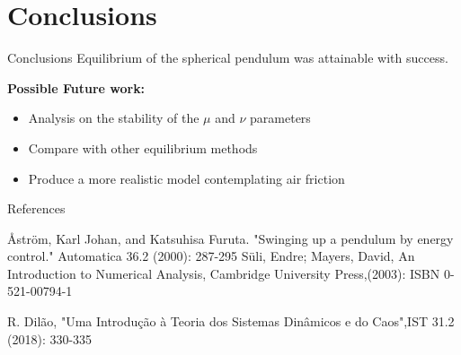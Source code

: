 \documentclass{beamer}
\begin{document}
\section{Conclusions}
\begin{frame}{Conclusions}
  Equilibrium of the spherical pendulum was attainable with success.
  
  \textbf{Possible Future work:}
  
  \begin{itemize}
  \item Analysis on the stability of the $\mu$ and $\nu$ parameters
  \item Compare with other equilibrium methods
  \item Produce a more realistic model contemplating air friction
  \end{itemize}
\end{frame}
\begin{frame}{References}
  \begin{thebibliography}{99}

 Åström, Karl Johan, and Katsuhisa Furuta. "Swinging up a pendulum by energy control." Automatica 36.2 (2000): 287-295
Süli, Endre; Mayers, David, An Introduction to Numerical Analysis, Cambridge University Press,(2003): ISBN 0-521-00794-1 

 R. Dilão, "Uma Introdução à Teoria dos Sistemas Dinâmicos e do Caos",IST 31.2 (2018): 330-335

\end{thebibliography}
  \end{frame}
\end{document}
